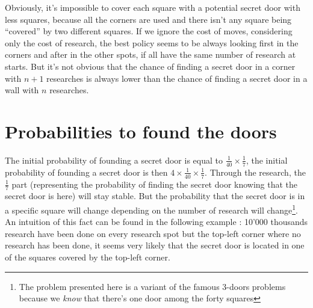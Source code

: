 \documentclass{article}
\begin{document}
\begin{center}
\end{center}
Obviously, it's impossible to cover each square with a potential secret door
with less squares, because all the corners are used and there isn't any square
being ``covered'' by two different squares. If we ignore the cost of moves,
considering only the cost of research, the best policy seems to be always
looking first in the corners and after in the other spots, if all have the same
number of research at starts. But it's not obvious that the chance of finding a
secret door in a corner with $n+1$ researches is always lower than the chance
of finding a secret door in a wall with $n$ researches.

\section{Probabilities to found the doors}
The initial probability of founding a secret door is equal to
$\frac{1}{40} \times \frac{1}{7}$, the initial probability of founding a secret
door is then $4 \times \frac{1}{40} \times \frac{1}{7}$. Through the research,
the $\frac{1}{7}$ part (representing the probability of finding the secret door
knowing that the secret door is here) will stay stable. But the probability
that the secret door is in a specific square will change depending on the
number of research will change\footnote{The problem presented here is a variant
of the famous 3-doors problems because we \emph{know} that there's one door
among the forty squares}.\\
An intuition of this fact can be found in the following example : 10'000
thousands research have been done on every research spot but the top-left
corner where no research has been done, it seems very likely that the secret
door is located in one of the squares covered by the top-left corner.
\end{document}
